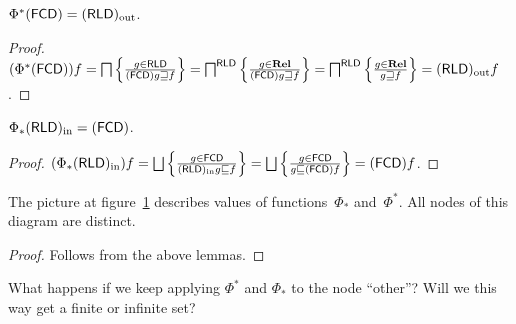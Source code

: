 \begin{lem}
  $\Phi^{\ast}  (\mathsf{FCD}) = (\mathsf{RLD})_{\mathrm{out}}$.
\end{lem}

\begin{proof}
  $(\Phi^{\ast}  (\mathsf{FCD})) f = \bigsqcap \left\{ \frac{ g \in
  \mathsf{RLD} }{ (\mathsf{FCD}) g
  \sqsupseteq f }\right\} = \bigsqcap^{\mathsf{RLD}} \left\{ \frac{ g \in \mathbf{Rel}
  }{ (\mathsf{FCD}) g \sqsupseteq f }\right\} =
  \bigsqcap^{\mathsf{RLD}} \left\{ \frac{ g \in \mathbf{Rel} }{ g
  \sqsupseteq f }\right\} = (\mathsf{RLD})_{\mathrm{out}} f$.
\end{proof}

\begin{lem}
  $\Phi_{\ast} (\mathsf{RLD})_{\mathrm{in}} = (\mathsf{FCD})$.
\end{lem}

\begin{proof}
  $(\Phi_{\ast} \torldin) f = \bigsqcup \setcond{ g
  \in \mathsf{FCD} }{
 \torldin g \sqsubseteq f } = \bigsqcup
  \setcond{ g \in \mathsf{FCD} }{ g \sqsubseteq
  \tofcd f } = \tofcd f$.
\end{proof}

\begin{thm}
The picture at figure~\ref{dia:fcd-rld-gal} describes values of functions~$\Phi_{\ast}$ and~$\Phi^{\ast}$.
All nodes of this diagram are distinct.
\begin{figure}
  \caption{\label{dia:fcd-rld-gal}}
\end{figure}
\end{thm}

\begin{proof}
Follows from the above lemmas.
\end{proof}

\begin{question}
What happens if we keep applying $\Phi^{\ast}$ and $\Phi_{\ast}$ to the node ``other''?
Will we this way get a finite or infinite set?
\end{question}

